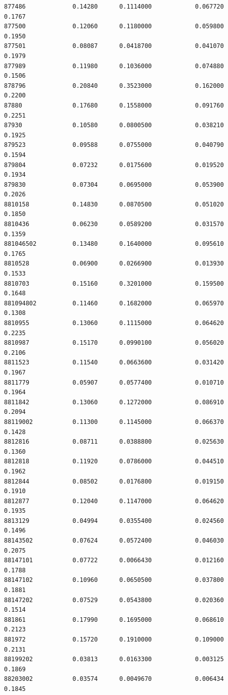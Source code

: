 \documentclass[
  letterpaper,
  DIV=11,
  numbers=noendperiod]{scrartcl}
\begin{document}
\begin{verbatim}
877486             0.14280      0.1114000            0.067720        0.1767
877500             0.12060      0.1180000            0.059800        0.1950
877501             0.08087      0.0418700            0.041070        0.1979
877989             0.11980      0.1036000            0.074880        0.1506
878796             0.20840      0.3523000            0.162000        0.2200
87880              0.17680      0.1558000            0.091760        0.2251
87930              0.10580      0.0800500            0.038210        0.1925
879523             0.09588      0.0755000            0.040790        0.1594
879804             0.07232      0.0175600            0.019520        0.1934
879830             0.07304      0.0695000            0.053900        0.2026
8810158            0.14830      0.0870500            0.051020        0.1850
8810436            0.06230      0.0589200            0.031570        0.1359
881046502          0.13480      0.1640000            0.095610        0.1765
8810528            0.06900      0.0266900            0.013930        0.1533
8810703            0.15160      0.3201000            0.159500        0.1648
881094802          0.11460      0.1682000            0.065970        0.1308
8810955            0.13060      0.1115000            0.064620        0.2235
8810987            0.15170      0.0990100            0.056020        0.2106
8811523            0.11540      0.0663600            0.031420        0.1967
8811779            0.05907      0.0577400            0.010710        0.1964
8811842            0.13060      0.1272000            0.086910        0.2094
88119002           0.11300      0.1145000            0.066370        0.1428
8812816            0.08711      0.0388800            0.025630        0.1360
8812818            0.11920      0.0786000            0.044510        0.1962
8812844            0.08502      0.0176800            0.019150        0.1910
8812877            0.12040      0.1147000            0.064620        0.1935
8813129            0.04994      0.0355400            0.024560        0.1496
88143502           0.07624      0.0572400            0.046030        0.2075
88147101           0.07722      0.0066430            0.012160        0.1788
88147102           0.10960      0.0650500            0.037800        0.1881
88147202           0.07529      0.0543800            0.020360        0.1514
881861             0.17990      0.1695000            0.068610        0.2123
881972             0.15720      0.1910000            0.109000        0.2131
88199202           0.03813      0.0163300            0.003125        0.1869
88203002           0.03574      0.0049670            0.006434        0.1845

\end{verbatim}
\end{document}
